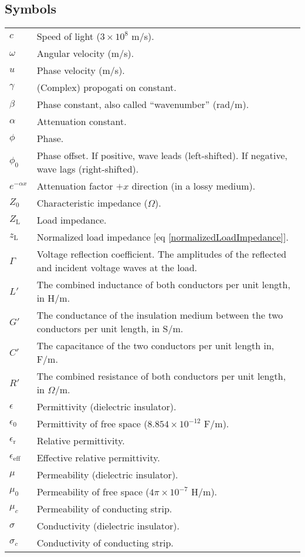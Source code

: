 \documentclass[letterpaper, 10pt]{article}
\begin{document}
\scriptsize
\begin{multicols*}{4}

  \section{Symbols}
  
  \begin{tabularx}{\linewidth}{l X}
    $c$ & Speed of light ($3\times10^8$ m/s). \\
    $\omega$ & Angular velocity (m/s). \\
    $u$ & Phase velocity (m/s). \\
    $\gamma$ & (Complex) propogati on constant.\\
    $\beta$ & Phase constant, also called ``wavenumber'' (rad/m). \\
    $\alpha$ & Attenuation constant. \\
    $\phi$ & Phase. \\
    $\phi_0$ & Phase offset. If positive, wave leads (left-shifted). If negative, wave lags (right-shifted). \\
    $e^{-\alpha x}$ & Attenuation factor $+x$ direction (in a lossy medium). \\
    $Z_0$ & Characteristic impedance ($\Omega$). \\
    $Z_{\text{L}}$ & Load impedance. \\
    $z_{\text{L}}$ & Normalized load impedance [eq \eqref{normalizedLoadImpedance}]. \\
    $\Gamma$ & Voltage reflection coefficient. The amplitudes of the reflected and incident voltage waves at the load.\\
    $L'$ & The combined inductance of both conductors per unit length, in H/m. \\
    $G'$ & The conductance of the insulation medium between the two
    conductors per unit length, in S/m. \\
    $C'$ & The capacitance of the two conductors per unit length in, F/m. \\
    $R'$ & The combined resistance of both conductors per unit length, in $\Omega$/m. \\
    $\epsilon$ & Permittivity (dielectric insulator). \\
    $\epsilon_0$ & Permittivity of free space ($8.854\times 10^{-12}$ F/m). \\
    $\epsilon_{\text{r}}$ & Relative permittivity. \\
    $\epsilon_{\text{eff}}$ & Effective relative permittivity. \\
    $\mu$ & Permeability (dielectric insulator). \\
    $\mu_0$ & Permeability of free space ($4\pi\times 10^{-7}$ H/m). \\
    $\mu_c$ & Permeability of conducting strip. \\
    $\sigma$ & Conductivity (dielectric insulator). \\
    $\sigma_c$ & Conductivity of conducting strip. \\
  \end{tabularx}
  

\end{multicols*}
\end{document}

